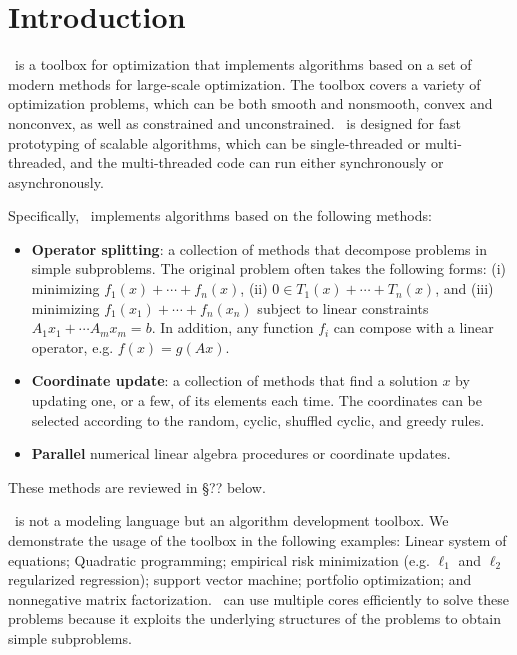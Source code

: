 \section{Introduction}
\pkg~is a toolbox for optimization that implements algorithms based on a set of modern methods for large-scale optimization. The toolbox covers a variety of optimization problems, which can  be both smooth and nonsmooth, convex and nonconvex, as well as constrained and unconstrained.  \pkg~is designed for fast prototyping of scalable algorithms, which can be  single-threaded or multi-threaded, and the multi-threaded code can run either synchronously or asynchronously. 

Specifically, \pkg~implements  algorithms based on  the following methods:
\begin{itemize}
\item \textbf{Operator splitting}: a collection of methods that decompose problems in simple subproblems. The original problem often takes the following forms: (i) minimizing $f_1(x)+\cdots+f_n(x)$, (ii) $0\in T_1(x)+\cdots +T_n(x)$, and (iii) minimizing $f_1(x_1)+\cdots+f_n(x_n)$ subject to linear constraints $A_1 x_1+\cdots A_m x_m=b$. In addition, any function $f_i$ can compose with a linear operator, e.g. $f(x) = g(Ax)$.

\item \textbf{Coordinate update}: a collection of methods that find a solution $x$ by updating one, or a few, of its elements each time. The coordinates can be selected according to the random, cyclic, shuffled cyclic, and greedy rules.
 
\item \textbf{Parallel} numerical linear algebra procedures or coordinate updates.
\end{itemize}
These methods are reviewed in \S?? below.

\pkg~is not a modeling language but an algorithm development toolbox. %
We demonstrate the usage of the toolbox in the following examples:
 Linear system of equations;
Quadratic programming;
empirical risk minimization (e.g. $\ell_1$ and $\ell_2$ regularized  regression);
support vector machine;
portfolio optimization;
and nonnegative matrix factorization. \pkg~can use multiple cores efficiently to solve these  problems because it exploits the underlying structures of the problems to obtain simple subproblems. %

